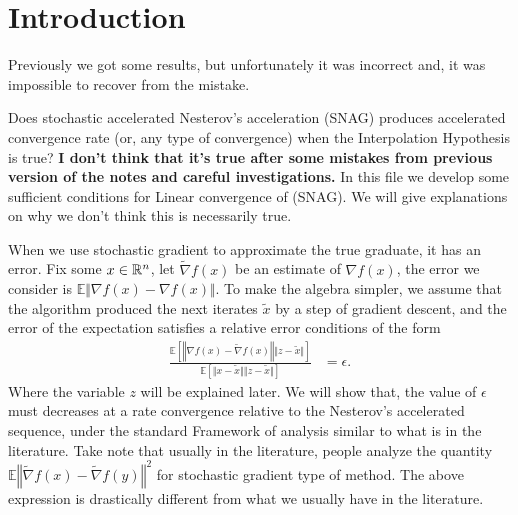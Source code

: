 \documentclass[12pt]{article}
\newcommand{\expect}{\ensuremath{\mathbb E}}
\begin{document}
\section{Introduction}
    \cite{bauschke_convex_2017}
    Previously we got some results, but unfortunately it was incorrect and, it was impossible to recover from the mistake. 
    \par
    Does stochastic accelerated Nesterov's acceleration (SNAG) produces accelerated convergence rate (or, any type of convergence) when the Interpolation Hypothesis is true? 
    \textbf{I don't think that it's true after some mistakes from previous version of the notes and careful investigations.}
    In this file we develop some sufficient conditions for Linear convergence of (SNAG). 
    We will give explanations on why we don't think this is necessarily true. 
    \par
    When we use stochastic gradient to approximate the true graduate, it has an error. 
    Fix some $x\in \mathbb R^n$, let $\tilde \nabla f(x)$ be an estimate of $\nabla f(x)$, the error we consider is $\expect \Vert \nabla f(x) - \nabla f(x)\Vert$. 
    To make the algebra simpler, we assume that the algorithm produced the next iterates $\tilde x$ by a step of gradient descent, and the error of the expectation satisfies a relative error conditions of the form 
    \begin{align*}
        \frac{
            \expect \left[
                \left\Vert \nabla f(x) - \tilde \nabla f(x) \right\Vert \Vert z - \tilde x\Vert
            \right]
            }{
            \expect \left[
                \Vert x - \tilde x\Vert\Vert z - \tilde x\Vert
            \right]
            } &= \epsilon. 
    \end{align*}
    Where the variable $z$ will be explained later. 
    We will show that, the value of $\epsilon$ must decreases at a rate convergence relative to the Nesterov's accelerated sequence, under the standard Framework of analysis similar to what is in the literature. 
    Take note that usually in the literature, people analyze the quantity $\expect\left\Vert \tilde \nabla f(x) - \tilde \nabla f(y)\right\Vert^2$ for stochastic gradient type  of method. 
    The above expression is drastically different from what we usually have in the literature. 
\end{document}
